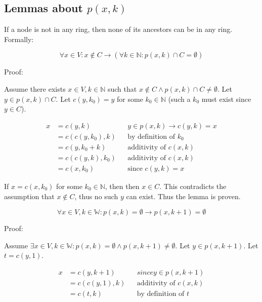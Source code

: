 \documentclass[11pt]{article}
\begin{document}
    \subsection{Lemmas about $p(x,k)$}

    If a node is not in any ring, then none of its ancestors can be in any ring. Formally:

    \begin{equation}
        \forall x \in V: x \notin C \rightarrow (\forall k \in \mathbb{N} : p(x,k) \cap C = \emptyset)
        \label{not_ring_then_parent_not_in_ring}
    \end{equation}

    Proof:

    Assume there exists $x \in V, k \in \mathbb{N}$ such that $x \notin C \land p(x,k) \cap C \not = \emptyset$. Let $y \in p(x,k) \cap C$. Let $c(y,k_{0})=y$ for some $k_{0} \in \mathbb{N}$ (such a $k_{0}$ must exist since $y \in C$).

    \begin{align*}
        \text{$x$} &= \text{$c(y,k)$} && \text{$y \in p(x,k) \rightarrow c(y,k) = x$} \\
        &= \text{$c(c(y,k_{0}),k)$} && \text{by definition of $k_{0}$} \\
        &= \text{$c(y,k_{0}+k)$} && \text{additivity of $c(x,k)$} \\
        &= \text{$c(c(y,k),k_{0})$} && \text{additivity of $c(x,k)$} \\
        &= \text{$c(x,k_{0})$} && \text{since $c(y,k) = x$}
    \end{align*}

    If $x=c(x,k_{0})$ for some $k_{0} \in \mathbb{N}$, then then $x \in C$. This contradicts the assumption that $x \notin C$, thus no such $y$ can exist. Thus the lemma is proven.

    \begin{equation}
        \forall x \in V,k \in \mathbb{W}: p(x,k) = \emptyset \rightarrow p(x,k+1) = \emptyset
        \label{no_parents_k_k+1}
    \end{equation}

    Proof:

    Assume $\exists x \in V, k \in \mathbb{W}: p(x,k)= \emptyset \land p(x,k+1) \not = \emptyset$. Let $y \in p(x,k+1)$. Let $t=c(y,1)$.

    \begin{align*}
        \text{$x$} &= \text{$c(y,k+1)$} && \text{$since y \in p(x,k+1)$} \\
        &= \text{$c(c(y,1),k)$} && \text{additivity of $c(x,k)$} \\
        &= \text{$c(t,k)$} && \text{by definition of $t$}
    \end{align*}
\end{document}
